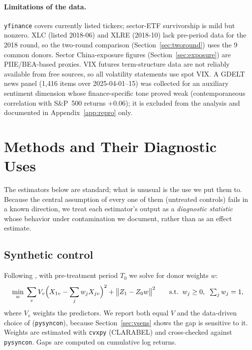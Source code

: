 \documentclass[11pt,a4paper]{article}
\begin{document}
\paragraph{Limitations of the data.} \texttt{yfinance} covers currently
listed tickers; sector-ETF survivorship is mild but nonzero. XLC (listed
2018-06) and XLRE (2018-10) lack pre-period data for the 2018 round, so the
two-round comparison (Section~\ref{sec:tworound}) uses the 9 common donors.
Sector China-exposure figures (Section~\ref{sec:exposure}) are PIIE/BEA-based
proxies. VIX futures term-structure data are not reliably available from
free sources, so all volatility statements use spot VIX. A GDELT news panel
(1{,}416 items over 2025-04-01--15) was collected for an auxiliary sentiment
dimension whose finance-specific tone proved weak (contemporaneous
correlation with S\&P~500 returns $+0.06$); it is excluded from the
analysis and documented in Appendix~\ref{app:repro} only.

\section{Methods and Their Diagnostic Uses}\label{sec:method}

The estimators below are standard; what is unusual is the use we put them
to. Because the central assumption of every one of them (untreated
controls) fails in a known direction, we treat each estimator's output as a
\emph{diagnostic statistic} whose behavior under contamination we document,
rather than as an effect estimate.

\subsection{Synthetic control}\label{sec:scm}

Following \citet{abadie2010}, with pre-treatment period $T_0$ we solve for
donor weights $w$:
\begin{equation}
\min_{w} \;\sum_{v} V_v\Bigl(X_{1v}-\sum_{j} w_j X_{jv}\Bigr)^{2}
+\bigl\lVert Z_1 - Z_0 w\bigr\rVert^{2}
\qquad \text{s.t.}\;\; w_j\ge 0,\;\; \textstyle\sum_j w_j = 1 ,
\label{eq:scm}
\end{equation}
where $V_v$ weights the predictors. We report both equal $V$ and the
data-driven choice of \citet{abadie2021} (\texttt{pysyncon}), because
Section~\ref{sec:vsens} shows the gap is sensitive to it. Weights are
estimated with \texttt{cvxpy} (CLARABEL) and cross-checked against
\texttt{pysyncon}. Gaps are computed on cumulative log returns.
\end{document}
